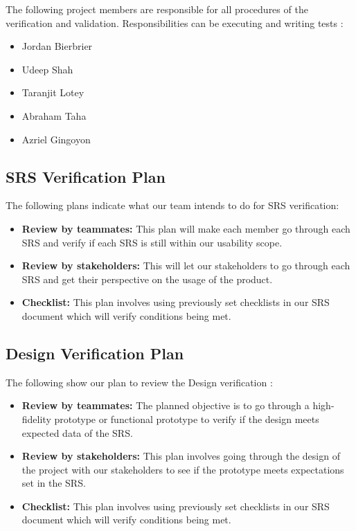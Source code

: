 \documentclass[12pt, titlepage]{article}
\begin{document}
The following project members are responsible for all procedures of the verification and validation. Responsibilities can be executing and writing tests :
\begin{itemize}
    \item Jordan Bierbrier 
    \item Udeep Shah
    \item Taranjit Lotey
    \item Abraham Taha
    \item Azriel Gingoyon
\end{itemize}

\subsection{SRS Verification Plan}

The following plans indicate what our team intends to do for SRS verification:
\begin{itemize}
    \item \textbf{Review by teammates:} This plan will make each member go through each SRS and verify if each SRS is still within our usability scope.
    \item \textbf{Review by stakeholders:} This will let our stakeholders to go through each SRS and get their perspective on the usage of the product.
    \item \textbf{Checklist:} This plan involves using previously set checklists in our SRS document which will verify conditions being met.
\end{itemize}

\subsection{Design Verification Plan}

The following show our plan to review the Design verification :
\begin{itemize}
    \item \textbf{Review by teammates:} The planned objective is to go through a high-fidelity prototype or functional prototype to verify if the design meets expected data of the SRS.
    \item \textbf{Review by stakeholders:} This plan involves going through the design of the project with our stakeholders to see if the prototype meets expectations set in the SRS.
    \item \textbf{Checklist:} This plan involves using previously set checklists in our SRS document which will verify conditions being met. 
\end{itemize}
\end{document}
